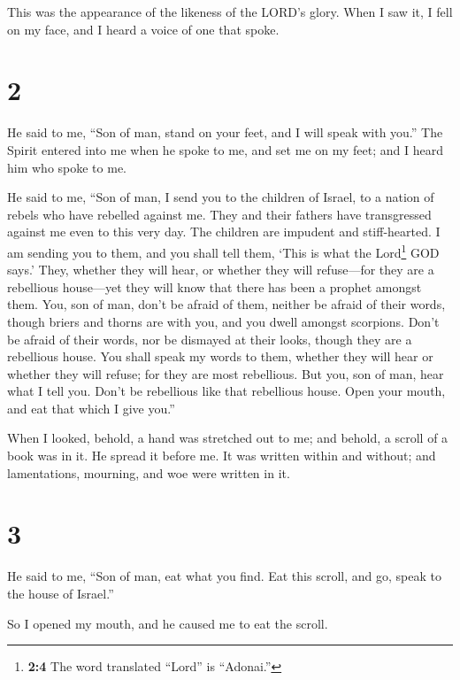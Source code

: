 This was the appearance of the likeness of the LORD's glory. When I saw
it, I fell on my face, and I heard a voice of one that spoke.

\hypertarget{section-1}{%
\section{2}\label{section-1}}

 He said to me, ``Son of man, stand on your feet, and I
will speak with you.''  The Spirit entered into me when he
spoke to me, and set me on my feet; and I heard him who spoke to me.

 He said to me, ``Son of man, I send you to the children
of Israel, to a nation of rebels who have rebelled against me. They and
their fathers have transgressed against me even to this very day.
 The children are impudent and stiff-hearted. I am sending
you to them, and you shall tell them, `This is what the Lord\footnote{\textbf{2:4}
  The word translated ``Lord'' is ``Adonai.''} GOD says.' 
They, whether they will hear, or whether they will refuse---for they are
a rebellious house---yet they will know that there has been a prophet
amongst them.  You, son of man, don't be afraid of them,
neither be afraid of their words, though briers and thorns are with you,
and you dwell amongst scorpions. Don't be afraid of their words, nor be
dismayed at their looks, though they are a rebellious house.
 You shall speak my words to them, whether they will hear
or whether they will refuse; for they are most rebellious.
 But you, son of man, hear what I tell you. Don't be
rebellious like that rebellious house. Open your mouth, and eat that
which I give you.''

 When I looked, behold, a hand was stretched out to me;
and behold, a scroll of a book was in it.  He spread it
before me. It was written within and without; and lamentations,
mourning, and woe were written in it.

\hypertarget{section-2}{%
\section{3}\label{section-2}}

 He said to me, ``Son of man, eat what you find. Eat this
scroll, and go, speak to the house of Israel.''

 So I opened my mouth, and he caused me to eat the scroll.

